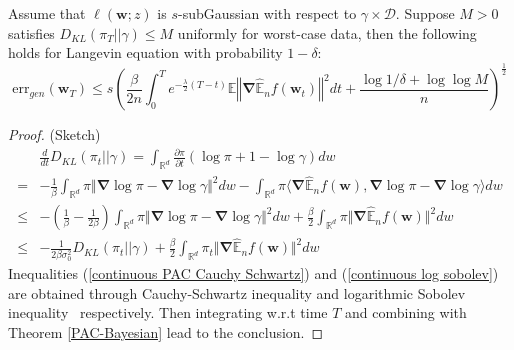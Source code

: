 \documentclass[final,12pt]{colt2018} %
\begin{document}
\begin{proposition}\label{ideal-pac-bayes-2}
  Assume that $\ell(\bm{w};z)$ is $s$-subGaussian with respect to $\gamma\times \mathcal{D}$. Suppose $M>0$ satisfies $D_{KL}(\pi_T||\gamma)\leq M$ uniformly for worst-case data, then the following holds for Langevin equation with probability $1-\delta$:
\begin{equation}
  \mathrm{err}_{gen}(\bm{w}_T)\leq s\left(\frac{\beta}{2n}\int_{0}^T e^{-\frac{\lambda}{2}(T-t)}\mathbb{E} \left\Vert \bm{\nabla}\hat{\mathbb{E}}_n f(\bm{w}_t)\right\Vert^2dt+\frac{\log 1/\delta+\log\log M}{n}\right)^{\frac{1}{2}}
\end{equation}
\end{proposition}
\begin{proof}(Sketch)
\begin{align}
&\frac{d}{dt}D_{KL}(\pi_t||\gamma)=\int_{\mathbb{R}^d} \frac{\partial \pi}{\partial t}(\log \pi+1-\log \gamma)dw \nonumber\\
=&-\frac{1}{\beta}\int_{\mathbb{R}^d} \pi\Vert \bm{\nabla} \log \pi-\bm{\nabla}\log\gamma\Vert^2dw - \int_{\mathbb{R}^d} \pi\langle \bm{\nabla}\hat{\mathbb{E}}_n f(\bm{w}), \bm{\nabla} \log \pi-\bm{\nabla} \log \gamma\rangle dw \nonumber \\
\leq &-\left(\frac{1}{\beta}-\frac{1}{2\beta}\right)\int_{\mathbb{R}^d} \pi\Vert \bm{\nabla} \log \pi-\bm{\nabla}\log\gamma\Vert^2dw+\frac{\beta}{2}\int_{\mathbb{R}^d} \pi \Vert \bm{\nabla}\hat{\mathbb{E}}_n f(\bm{w})\Vert^2dw \label{continuous PAC Cauchy Schwartz}\\
\leq & -\frac{1}{2\beta\sigma_0^2}D_{KL}(\pi_t||\gamma)+\frac{\beta}{2}\int_{\mathbb{R}^d} \pi_t \Vert \bm{\nabla}\hat{\mathbb{E}}_n f(\bm{w})\Vert^2dw \label{continuous log sobolev}
\end{align}
Inequalities (\ref{continuous PAC Cauchy Schwartz}) and (\ref{continuous log sobolev}) are obtained through Cauchy-Schwartz inequality and logarithmic Sobolev inequality~\citep{gross1975logarithmic} respectively. Then integrating w.r.t time $T$ and combining with Theorem \ref{PAC-Bayesian} lead to the conclusion.

\end{proof}
\end{document}
